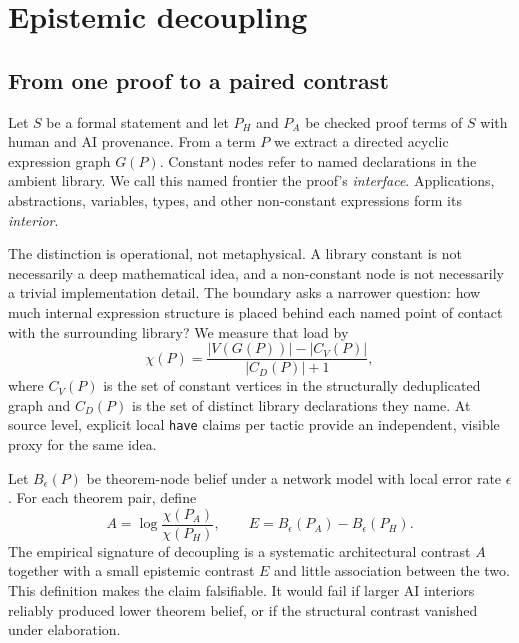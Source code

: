 \documentclass[11pt]{article}
\newcommand{\code}[1]{\texttt{#1}}
\begin{document}
\section{Epistemic decoupling}

\subsection{From one proof to a paired contrast}

Let $S$ be a formal statement and let $P_H$ and $P_A$ be checked proof terms of $S$ with human and AI
provenance.  From a term $P$ we extract a directed acyclic expression graph $G(P)$.  Constant nodes
refer to named declarations in the ambient library.  We call this named frontier the proof's
\emph{interface}.  Applications, abstractions, variables, types, and other non-constant expressions
form its \emph{interior}.

The distinction is operational, not metaphysical.  A library constant is not necessarily a deep
mathematical idea, and a non-constant node is not necessarily a trivial implementation detail.  The
boundary asks a narrower question: how much internal expression structure is placed behind each
named point of contact with the surrounding library?  We measure that load by
\begin{equation}
  \chi(P)=\frac{|V(G(P))|-|C_V(P)|}{|C_D(P)|+1},
  \label{eq:interior}
\end{equation}
where $C_V(P)$ is the set of constant vertices in the structurally deduplicated graph and $C_D(P)$
is the set of distinct library declarations they name.  At source level, explicit local \code{have}
claims per tactic provide an independent, visible proxy for the same idea.

Let $B_\epsilon(P)$ be theorem-node belief under a network model with local error rate $\epsilon$.
For each theorem pair, define
\begin{equation}
  A=\log\frac{\chi(P_A)}{\chi(P_H)}, \qquad
  E=B_\epsilon(P_A)-B_\epsilon(P_H).
  \label{eq:decoupling}
\end{equation}
The empirical signature of decoupling is a systematic architectural contrast $A$ together with a
small epistemic contrast $E$ and little association between the two.  This definition makes the
claim falsifiable.  It would fail if larger AI interiors reliably produced lower theorem belief, or
if the structural contrast vanished under elaboration.
\end{document}
